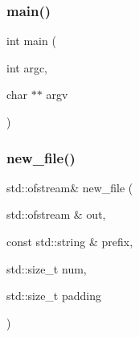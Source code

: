 \subsubsection{\texorpdfstring{main()}{main()}}
{\footnotesize\ttfamily int main (\begin{DoxyParamCaption}\item[{int}]{argc,  }\item[{char $\ast$$\ast$}]{argv }\end{DoxyParamCaption})}

\mbox{\label{irk-part_8cpp_a2af07694fa5e0af7134d2a71053b7519}} 
\subsubsection{\texorpdfstring{new\+\_\+file()}{new\_file()}}
{\footnotesize\ttfamily std\+::ofstream\& new\+\_\+file (\begin{DoxyParamCaption}\item[{std\+::ofstream \&}]{out,  }\item[{const std\+::string \&}]{prefix,  }\item[{std\+::size\+\_\+t}]{num,  }\item[{std\+::size\+\_\+t}]{padding }\end{DoxyParamCaption})}

